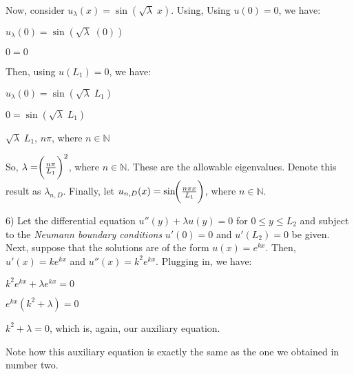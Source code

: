 \documentclass[12pt, executivepaper]{article}
\begin{document}
\pagebreak

\vspace*{-40mm}

\begin{flushleft}

Now, consider $u_{\lambda}(x)=\sin(\sqrt{\lambda} \; x)$. Using, Using $u(0)=0$, we have:

\begin{center}

$u_{\lambda}(0)=\sin(\sqrt{\lambda} \; (0))$

$0=0$

\end{center}

\vspace{3mm}

Then, using $u(L_{1})=0$, we have: 

\begin{center}

$u_{\lambda}(0)=\sin(\sqrt{\lambda} \; L_{1})$

$0=\sin(\sqrt{\lambda} \; L_{1})$

$\sqrt{\lambda} \; L_{1}$, $n\pi$, where $n \in \mathbb{N}$

\end{center}

\vspace{3mm}

So, $\lambda= \hspace{-1mm} \bigg(\frac{n\pi}{L_{1}}\bigg)^2$, where $n \in \mathbb{N}$. These are the allowable eigenvalues. Denote this result as $\lambda_{n,D}$. Finally, let $u_{n,D}(x)=\sin \hspace{-1mm} \bigg(\frac{n \pi x}{L_{1}}\bigg)$, where $n \in \mathbb{N}$.

\end{flushleft}

\vspace{5mm}

\begin{flushleft}

6) Let the differential equation $u''(y)+\lambda u(y)=0$ for $0 \leq y \leq L_{2}$ and subject to the \textit{Neumann boundary conditions} $u'(0)=0$ and $u'(L_{2})=0$ be given. Next, suppose that the solutions are of the form $u(x)=e^{kx}$. Then, $u'(x)=ke^{kx}$ and $u''(x)=k^2e^{kx}$. Plugging in, we have: 

\begin{center}

$k^2e^{kx}+ \lambda e^{kx}=0$

$e^{kx}(k^2+ \lambda)=0$

$k^2+ \lambda=0$, which is, again, our auxiliary equation.

\end{center}

Note how this auxiliary equation is exactly the same as the one we obtained in number two.

\end{flushleft}
\end{document}
